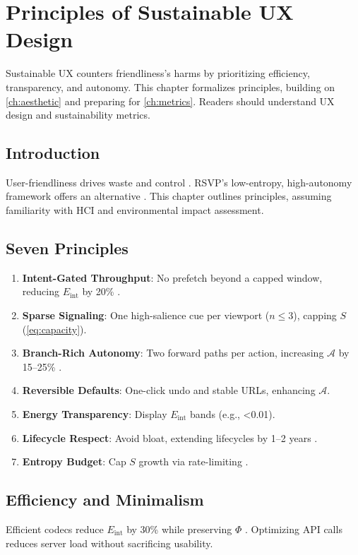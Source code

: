 \documentclass[openany]{book}
\newcommand{\PhiS}{\Phi} %
\newcommand{\Sent}{S} %
\newcommand{\Eint}{E_{\mathrm{int}}} %
\newcommand{\Auton}{\mathcal{A}} %
\newcommand{\kWh}{\mathrm{kWh}}
\begin{document}
\chapter{Principles of Sustainable UX Design}
\label{ch:principles}

Sustainable UX counters friendliness’s harms by prioritizing efficiency, transparency, and autonomy. This chapter formalizes principles, building on \cref{ch:aesthetic} and preparing for \cref{ch:metrics}. Readers should understand UX design and sustainability metrics.

\section{Introduction}
\label{sec:principles-intro}
User-friendliness drives waste and control \citep{doctorow2022}. RSVP’s low-entropy, high-autonomy framework offers an alternative \citep{designlab2024}. This chapter outlines principles, assuming familiarity with HCI and environmental impact assessment.

\section{Seven Principles}
\label{sec:seven}
\begin{enumerate}[label=\textbf{P\arabic*}.]
  \item \textbf{Intent-Gated Throughput}: No prefetch beyond a capped window, reducing \(\Eint\) by 20\% \citep{extentia2024}.
  \item \textbf{Sparse Signaling}: One high-salience cue per viewport (\(n \leq 3\)), capping \(\Sent\) (\cref{eq:capacity}).
  \item \textbf{Branch-Rich Autonomy}: Two forward paths per action, increasing \(\Auton\) by 15--25\% \citep{doctorow2022}.
  \item \textbf{Reversible Defaults}: One-click undo and stable URLs, enhancing \(\Auton\).
  \item \textbf{Energy Transparency}: Display \(\Eint\) bands (e.g., \SI{<0.01}{\kWh}).
  \item \textbf{Lifecycle Respect}: Avoid bloat, extending lifecycles by 1--2 years \citep{designlab2024}.
  \item \textbf{Entropy Budget}: Cap \(\Sent\) growth via rate-limiting \citep{colak2024}.
\end{enumerate}

\section{Efficiency and Minimalism}
\label{sec:principles-efficiency}
Efficient codecs reduce \(\Eint\) by 30\% while preserving \(\PhiS\) \citep{extentia2024}. Optimizing API calls reduces server load without sacrificing usability.
\end{document}
